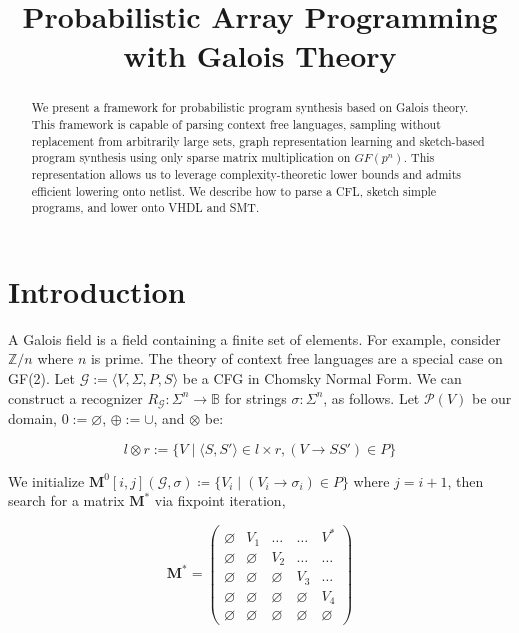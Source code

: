 \documentclass[sigplan,10pt,review,anonymous]{acmart}
\begin{document}
\title{Probabilistic Array Programming with Galois Theory}
\begin{abstract}
We present a framework for probabilistic program synthesis based on Galois theory. This framework is capable of parsing context free languages, sampling without replacement from arbitrarily large sets, graph representation learning and sketch-based program synthesis using only sparse matrix multiplication on $GF(p^n)$. This representation allows us to leverage complexity-theoretic lower bounds and admits efficient lowering onto netlist. We describe how to parse a CFL, sketch simple programs, and lower onto VHDL and SMT.
\end{abstract}
\maketitle

\section{Introduction}

A Galois field is a field containing a finite set of elements. For example, consider $\mathbb{Z}/n$ where $n$ is prime. The theory of context free languages are a special case on GF(2). Let $\mathcal{G} := \langle V, \Sigma, P, S\rangle$ be a CFG in Chomsky Normal Form. We can construct a recognizer $R_\mathcal{G}: \Sigma^n \rightarrow \mathbb{B}$ for strings $\sigma: \Sigma^n$, as follows. Let $\mathcal P(V)$ be our domain, $0 := \varnothing$, $\oplus := \cup$, and $\otimes$ be:

\[
l \otimes r := \{V \mid \langle S, S'\rangle \in l \times r, (V\rightarrow SS') \in P\}
\]

We initialize $\mathbf{M}^0[i, j](\mathcal{G}, \sigma) \coloneqq \{V_i \mid (V_i \rightarrow \sigma_i) \in P\}$ where $j = i+1$, then search for a matrix $\mathbf{M}^*$ via fixpoint iteration,

\[
\mathbf{M}^* = \begin{pmatrix}
            \varnothing & V_1 & \ldots & \ldots & V^* \\
            \varnothing & \varnothing & V_2 & \ldots & \ldots \\
            \varnothing & \varnothing & \varnothing & V_3 & \ldots \\
            \varnothing & \varnothing & \varnothing & \varnothing & V_4 \\
            \varnothing & \varnothing & \varnothing & \varnothing & \varnothing
\end{pmatrix}
\]
\end{document}
